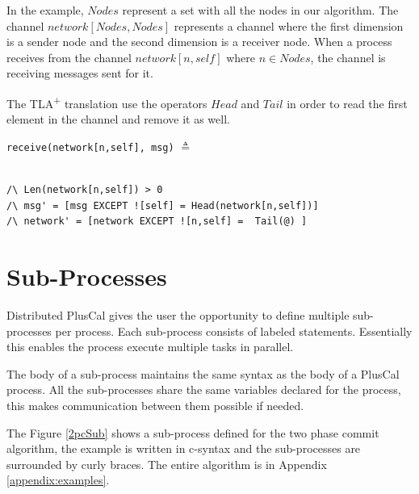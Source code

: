 \documentclass{thesul}
\newcommand{\tlaplus}{TLA\textsuperscript{+}\xspace}
\begin{document}
In the example, $Nodes$ represent a set with all the nodes in our algorithm. The channel $network[Nodes,Nodes]$ represents a channel where the first dimension is a sender node and the second dimension is a receiver node. When a process receives from the channel $network[n,self]$ where $n \in Nodes$, the channel is receiving messages sent for it.

The \tlaplus translation use the operators $Head$ and $Tail$ in order to read the first element in the channel and remove it as well.

\begin{minipage}{.35\textwidth}

\lstinline!receive(network[n,self], msg)! $\triangleq$\\\\
\end{minipage}
\begin{minipage}{\textwidth}
\begin{lstlisting}[frame = none, numbers = none]
/\ Len(network[n,self]) > 0 
/\ msg' = [msg EXCEPT ![self] = Head(network[n,self])]
/\ network' = [network EXCEPT ![n,self] =  Tail(@) ]
\end{lstlisting}
\end{minipage}\hfill\hfill


\section{Sub-Processes}
\label{subProcess}

Distributed PlusCal gives the user the opportunity to define multiple sub-processes per process. Each sub-process consists of labeled statements. Essentially this enables the process execute multiple tasks in parallel.

The body of a sub-process maintains the same syntax as the body of a PlusCal process. All the sub-processes share the same variables declared for the process, this makes communication between them possible if needed.

The Figure \ref{2pcSub} shows a sub-process defined for the two phase commit algorithm, the example is written in c-syntax and the sub-processes are surrounded by curly braces.
The entire algorithm is in Appendix \ref{appendix:examples}.
\end{document}
